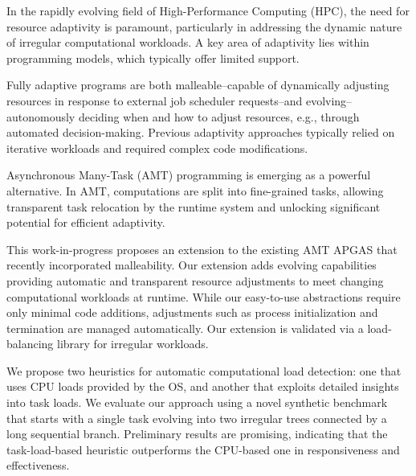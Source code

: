 In the rapidly evolving field of High-Performance Computing (HPC), the need for resource adaptivity is paramount, particularly in addressing the dynamic nature of irregular computational workloads. A key area of adaptivity lies within programming models, which typically offer limited support.

Fully adaptive programs are both malleable–capable of dynamically adjusting resources in response to external job scheduler requests–and evolving–autonomously deciding when and how to adjust resources, e.g., through automated decision-making. Previous adaptivity approaches typically relied on iterative workloads and required complex code modifications.

Asynchronous Many-Task (AMT) programming is emerging as a powerful alternative. In AMT, computations are split into fine-grained tasks, allowing transparent task relocation by the runtime system and unlocking significant potential for efficient adaptivity.

This work-in-progress proposes an extension to the existing AMT APGAS that recently incorporated malleability. Our extension adds evolving capabilities providing automatic and transparent resource adjustments to meet changing computational workloads at runtime. While our easy-to-use abstractions require only minimal code additions, adjustments such as process initialization and termination are managed automatically. Our extension is validated via a load-balancing library for irregular workloads.

We propose two heuristics for automatic computational load detection: one that uses CPU loads provided by the OS, and another that exploits detailed insights into task loads. We evaluate our approach using a novel synthetic benchmark that starts with a single task evolving into two irregular trees connected by a long sequential branch. Preliminary results are promising, indicating that the task-load-based heuristic outperforms the CPU-based one in responsiveness and effectiveness.
